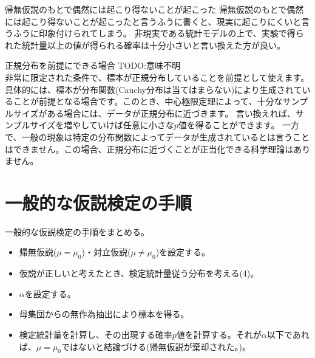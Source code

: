 \begin{SMbox}{帰無仮説のもとで偶然には起こり得ないことが起こった}
    帰無仮説のもとで偶然には起こり得ないことが起こったと言うふうに書くと、現実に起こりにくいと言うふうに印象付けられてしまう。
    非現実である統計モデルの上で、実験で得られた統計量以上の値が得られる確率は十分小さいと言い換えた方が良い。
\end{SMbox}
\fi


\begin{SMbox}{正規分布を前提にできる場合}
TODO:意味不明\\
非常に限定された条件で、標本が正規分布していることを前提として使えます。具体的には、標本が分布関数(Cauchy分布は当てはまらない)により生成されていることが前提となる場合です。このとき、中心極限定理によって、十分なサンプルサイズがある場合には、データが正規分布に近づきます。
言い換えれば、サンプルサイズを増やしていけば任意に小さな$p$値を得ることができます。
一方で、一般の現象は特定の分布関数によってデータが生成されているとは言うことはできません。この場合、正規分布に近づくことが正当化できる科学理論はありません。     
\end{SMbox}
\fi


\section{一般的な仮説検定の手順}
一般的な仮説検定の手順をまとめる。
%
\begin{framed}
    \begin{itemize}
        \item 帰無仮説($\mu = \mu_0$)・対立仮説($\mu\neq \mu_0$)を設定する。
        \item 仮説が正しいと考えたとき、検定統計量従う分布を考える(4)。
        \item $\alpha$を設定する。
        \item 母集団からの無作為抽出により標本を得る。
        \item 検定統計量を計算し、その出現する確率$p$値を計算する。それが$\alpha$以下であれば、$\mu=\mu_0$ではないと結論づける(帰無仮説が棄却された。)。%
    \end{itemize}
\end{framed}
\fi

